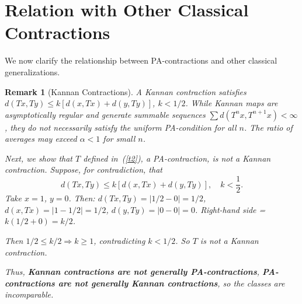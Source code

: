 \documentclass[11pt]{article}
\newtheorem{remark}[theorem]{Remark}
\begin{document}






\section{Relation with Other Classical Contractions}

We now clarify the relationship between PA-contractions and other classical generalizations.

\begin{remark}[Kannan Contractions]
A Kannan contraction satisfies $ d(Tx,Ty) \leq k[d(x,Tx) + d(y,Ty)] $, $ k < 1/2 $. While Kannan maps are asymptotically regular and generate summable sequences $ \sum d(T^n x, T^{n+1}x) < \infty $, they do not necessarily satisfy the uniform PA-condition for all $ n $. The ratio of averages may exceed $ \alpha < 1 $ for small $ n $. 

Next, we show that $ T $ defined in~(\ref{t2}), a PA-contraction, is not a Kannan contraction. Suppose, for contradiction, that
\begin{equation}
d(Tx,Ty) \leq k \left[ d(x,Tx) + d(y,Ty) \right], \quad k < \frac{1}{2}.
\end{equation}
Take $ x = 1 $, $ y = 0 $. Then:
 $ d(Tx,Ty) = |1/2 - 0| = 1/2 $,
 $ d(x,Tx) = |1 - 1/2| = 1/2 $,
 $ d(y,Ty) = |0 - 0| = 0 $.
 Right-hand side = $ k(1/2 + 0) = k/2 $.

Then $ 1/2 \leq k/2 \Rightarrow k \geq 1 $, contradicting $ k < 1/2 $. So $ T $ is not a Kannan contraction.


Thus, \textbf{Kannan contractions are not generally PA-contractions}, 
\textbf{PA-contractions are not generally Kannan contractions}, 
so the classes are incomparable.
\label{rem:kannan}
\end{remark}
\end{document}
